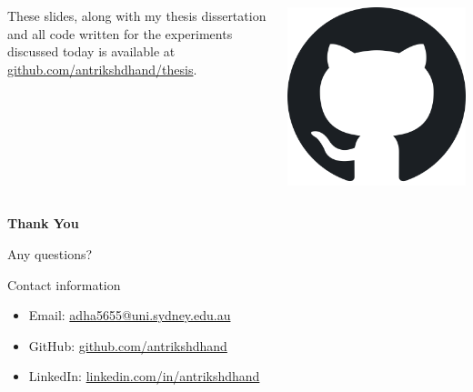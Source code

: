 \documentclass[]{beamer}
\begin{document}
\begin{frame}{}
	\begin{columns}
		\begin{column}{0.7\textwidth}
			These slides, along with my thesis dissertation and all code written for the experiments discussed today is available at \textcolor{cyan}{\href{https://github.com/antrikshdhand/thesis}{github.com/antrikshdhand/thesis}}.
		\end{column}
		\begin{column}{0.3\textwidth}
			\centering
			\includegraphics[width=\textwidth]{img/github.png}
		\end{column}
	\end{columns}
\end{frame}

\begin{frame}
	\centering
	\vspace{30pt}
	{\Huge\textbf{Thank You}}\\

	\vspace{30pt}

	{\Large Any questions?}

	\vspace{30pt}

	\large
	\begin{block}{Contact information}
		\begin{itemize}
			\item Email: \textcolor{cyan}{\href{mailto:adha5655@uni.sydney.edu.au}{adha5655@uni.sydney.edu.au}}
			\item GitHub: \textcolor{cyan}{\href{https://github.com/antrikshdhand}{github.com/antrikshdhand}}
			\item LinkedIn: \textcolor{cyan}{\href{https://www.linkedin.com/in/antrikshdhand}{linkedin.com/in/antrikshdhand}}
		\end{itemize}
\end{block}
\end{frame}
\end{document}
